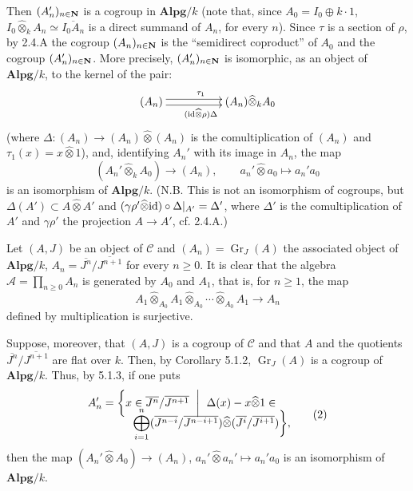 Then $(A_n')_{n\in\mathbf{N}}$ is a cogroup in $\mathbf{Alpg}/k$ (note that, since $A_0=I_0\oplus k\cdot1$, $I_0\widehat\otimes_k A_n\simeq\overline{I_0A_n}$ is a direct summand of $A_n$, for every $n$). Since $\tau$ is a section of $\rho$, by 2.4.A the cogroup $(A_n)_{n\in\mathbf{N}}$ is the ``semidirect coproduct'' of $A_0$ and the cogroup $(A_n')_{n\in\mathbf{N}}$. More precisely, $(A_n')_{n\in\mathbf{N}}$ is isomorphic, as an object of $\mathbf{Alpg}/k$, to the kernel of the pair:
\[
\xymatrix@C=50pt{(A_n)\ar@<.6ex>[r]^{\tau_1}\ar@<-.6ex>[r]_{(\id\widehat\otimes\rho)\Delta}&(A_n)\widehat\otimes_k A_0}
\]
(where $\Delta:(A_n)\to(A_n)\widehat\otimes(A_n)$ is the comultiplication of $(A_n)$ and $\tau_1(x)=x\widehat\otimes1$), and, identifying $A_n'$ with its image in $A_n$, the map
\[
(A_n'\widehat\otimes_k A_0)\longrightarrow(A_n),\qquad a_n'\widehat\otimes a_0\longmapsto a_n'a_0
\]
is an isomorphism of $\mathbf{Alpg}/k$. (N.B. This is not an isomorphism of cogroups, but $\Delta(A')\subset A\widehat\otimes A'$ and $(\gamma\rho'\widehat\otimes\mathrm{id})\circ\Delta|_{A'}=\Delta'$, where $\Delta'$ is the comultiplication of $A'$ and $\gamma\rho'$ the projection $A\to A'$, cf. 2.4.A.)

Let $(A,J)$ be an object of $\mathscr C$ and $(A_n)=\operatorname{Gr}_J(A)$ the associated object of $\mathbf{Alpg}/k$, \ie $A_n=\overline{J^n}/\overline{J^{n+1}}$ for every $n\ge0$. It is clear that the algebra $\mathscr A=\prod_{n\ge0}A_n$ is generated by $A_0$ and $A_1$, that is, for $n\ge1$, the map
\[
A_1\widehat\otimes_{A_0}A_1\widehat\otimes_{A_0}\cdots\widehat\otimes_{A_0}A_1\longrightarrow A_n\tag{1}
\]
defined by multiplication is surjective.

Suppose, moreover, that $(A,J)$ is a cogroup of $\mathscr C$ and that $A$ and the quotients $\overline{J^n}/\overline{J^{n+1}}$ are flat over $k$. Then, by Corollary 5.1.2, $\operatorname{Gr}_J(A)$ is a cogroup of $\mathbf{Alpg}/k$. Thus, by 5.1.3, if one puts
\[
\begin{split}
A_n'=\biggl\{x\in\overline{J^n}/\overline{J^{n+1}}\ \biggm|\
\Delta(x)-x\widehat\otimes1\in{}&\\[-12pt]
\bigoplus_{i=1}^n(\overline{J^{n-i}}/\overline{J^{n-i+1}})\widehat\otimes(\overline{J^i}/\overline{J^{i+1}})&\biggr\},
\end{split}\tag{2}
\]
then the map $(A_n'\widehat\otimes A_0)\to(A_n)$, $a_n'\widehat\otimes a_n'\mapsto a_n'a_0$ is an isomorphism of $\mathbf{Alpg}/k$.

